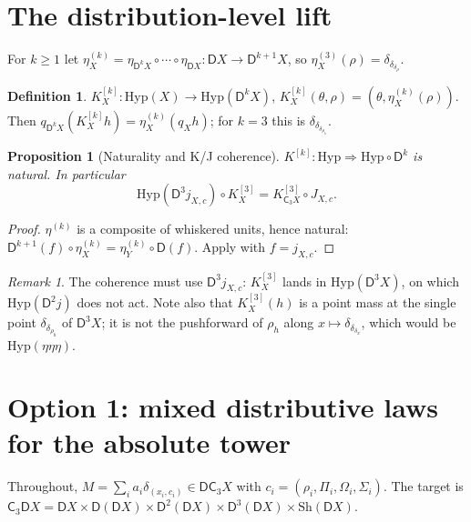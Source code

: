 \documentclass[11pt]{article}
\newtheorem{proposition}[theorem]{Proposition}
\theoremstyle{definition}
\newtheorem{definition}[theorem]{Definition}
\theoremstyle{remark}
\newtheorem{remark}[theorem]{Remark}
\newcommand{\D}{\mathsf{D}}
\newcommand{\Hyp}{\mathrm{Hyp}}
\newcommand{\Sh}{\mathrm{Sh}}
\newcommand{\C}{\mathsf{C}}
\begin{document}
\section{The distribution-level lift}

For $k\ge1$ let $\eta^{(k)}_X=\eta_{\D^kX}\circ\cdots\circ\eta_{\D X}\colon\D X\to\D^{k+1}X$, so
$\eta^{(3)}_X(\rho)=\delta_{\delta_{\delta_\rho}}$.

\begin{definition}
$K^{[k]}_X\colon\Hyp(X)\to\Hyp(\D^kX)$, $K^{[k]}_X(\theta,\rho)=(\theta,\eta^{(k)}_X(\rho))$. Then
$q_{\D^kX}(K^{[k]}_Xh)=\eta^{(k)}_X(q_Xh)$; for $k=3$ this is $\delta_{\delta_{\delta_{\rho_h}}}$.
\end{definition}

\begin{proposition}[Naturality and K/J coherence]\label{prop:K}
$K^{[k]}\colon\Hyp\Rightarrow\Hyp\circ\D^k$ is natural. In particular
\[
\Hyp(\D^3j_{X,c})\circ K^{[3]}_X=K^{[3]}_{\C_3X}\circ J_{X,c}.
\]
\end{proposition}
\begin{proof}
$\eta^{(k)}$ is a composite of whiskered units, hence natural:
$\D^{k+1}(f)\circ\eta^{(k)}_X=\eta^{(k)}_Y\circ\D(f)$. Apply with $f=j_{X,c}$.
\end{proof}

\begin{remark}
The coherence must use $\D^3j_{X,c}$: $K^{[3]}_X$ lands in $\Hyp(\D^3X)$, on which $\Hyp(\D^2j)$ does
not act. Note also that $K^{[3]}_X(h)$ is a point mass at the single point $\delta_{\delta_{\rho_h}}$ of
$\D^3X$; it is not the pushforward of $\rho_h$ along $x\mapsto\delta_{\delta_{\delta_x}}$, which would
be $\Hyp(\eta\eta\eta)$.
\end{remark}

\section{Option 1: mixed distributive laws for the absolute tower}\label{sec:laws}

Throughout, $M=\sum_ia_i\delta_{(x_i,c_i)}\in\D\C_3X$ with $c_i=(\rho_i,\Pi_i,\Omega_i,\Sigma_i)$.
The target is $\C_3\D X=\D X\times\D(\D X)\times\D^2(\D X)\times\D^3(\D X)\times\Sh(\D X)$.
\end{document}
